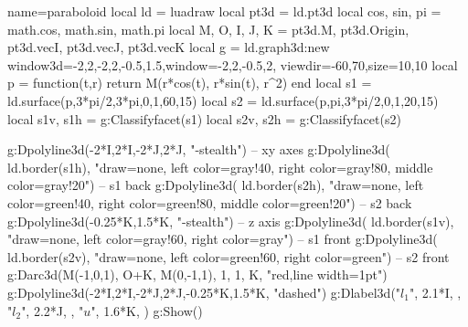 \documentclass{standalone}
\begin{document}
\begin{luadraw}{name=paraboloid}
local ld = luadraw
local pt3d = ld.pt3d
local cos, sin, pi = math.cos, math.sin, math.pi
local M, O, I, J, K = pt3d.M, pt3d.Origin, pt3d.vecI, pt3d.vecJ, pt3d.vecK
local g = ld.graph3d:new{
    window3d={-2,2,-2,2,-0.5,1.5},window={-2,2,-0.5,2},
    viewdir={-60,70},size={10,10}
}
local p = function(t,r) return M(r*cos(t), r*sin(t), r^2) end
local s1 = ld.surface(p,3*pi/2,3*pi,0,1,{60,15})
local s2 = ld.surface(p,pi,3*pi/2,0,1,{20,15})
local s1v, s1h = g:Classifyfacet(s1)
local s2v, s2h = g:Classifyfacet(s2)

g:Dpolyline3d({{-2*I,2*I},{-2*J,2*J}}, "-stealth") -- xy axes
g:Dpolyline3d( ld.border(s1h), "draw=none, left color=gray!40, right color=gray!80, middle color=gray!20") -- s1 back
g:Dpolyline3d( ld.border(s2h), "draw=none, left color=green!40, right color=green!80, middle color=green!20") -- s2 back
g:Dpolyline3d({-0.25*K,1.5*K}, "-stealth") -- z axis
g:Dpolyline3d( ld.border(s1v), "draw=none, left color=gray!60, right color=gray") -- s1 front
g:Dpolyline3d( ld.border(s2v), "draw=none, left color=green!60, right color=green") -- s2 front
g:Darc3d(M(-1,0,1), O+K, M(0,-1,1), 1, 1, K, "red,line width=1pt")
g:Dpolyline3d({{-2*I,2*I},{-2*J,2*J},{-0.25*K,1.5*K}}, "dashed")
g:Dlabel3d("$l_1$", 2.1*I, {}, "$l_2$", 2.2*J, {}, "$u$", 1.6*K, {})
g:Show()
\end{luadraw}
\end{document}
